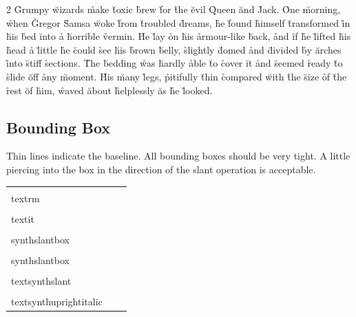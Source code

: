 \documentclass[a4paper]{article}
\def\synthslant{.16}
\def\synthnegslant{-.14}
\newcommand*{\code}[1]{\texttt{#1}}
\newcommand*{\cs}[1]{\texttt{\char`\\#1}}
\newcommand*{\fontsample}{aefgiv}
\newcommand*{\FONTSAMPLE}{H\AA{}MB\"URG\'EF\O{}\~N\v{S}}
\newcommand*{\showbaseline}{\space\rule{.5em}{.4pt}\space}
\newcommand*{\showboundingbox}[1]{
  {\setlength{\fboxsep}{0pt}
   \setlength{\fboxrule}{.4pt}
   \framebox{#1}}
}
\begin{document}
\begin{multicols}{2}
  \r{Grumpy} \u{wizards} \r{make} \u{toxic} \r{brew} \u{for} \r{the} \u{evil} \r{Queen} \u{and} \r{Jack.}
  \r{One} \u{morn\-ing,} \r{when} \u{Gregor} \r{Samsa} \u{woke} \r{from} \u{trou\-bled} \r{dreams,}
  \r{he} \u{found} \r{himself} \u{trans\-formed} \r{in} \u{his} \r{bed} \u{into} \r{a} \u{hor\-ri\-ble} \r{vermin.}
  \r{He} \u{lay} \r{on} \u{his} \r{armour-like} \u{back,}
  \r{and} \u{if} \r{he} \u{lifted} \u{his} \r{head}
  \r{a} \u{little} \r{he} \u{could} \r{see} \u{his} \r{brown} \u{belly,}
  \r{slightly} \u{domed} \r{and} \u{divided} \r{by} \u{arches} \r{into} \u{stiff} \r{sections.}
  \r{The} \u{bedding} \r{was} \u{hardly} \r{able} \u{to}
  \r{cover} \u{it} \r{and} \u{seemed} \r{ready} \u{to} \r{slide} \u{off} \r{any} \u{mo\-ment.}
  \r{His} \u{many} \r{legs,}
  \r{pitifully} \u{thin} \r{compared} \u{with} \r{the} \u{size} \r{of} \u{the} \r{rest} \u{of} \r{him,}
  \r{waved} \u{about} \r{helplessly} \u{as} \r{he} \u{looked.}
\end{multicols}

\clearpage
\subsection{Bounding Box}

Thin lines indicate the baseline.  All bounding boxes should be very tight.  A little piercing
into the box in the direction of the slant operation is acceptable.

\begin{center}
  \begin{tabular}{@{}l@{\showbaseline}l@{\showbaseline}l@{\showbaseline}}
    \cs{textrm}  &
    \showboundingbox{\textrm{\fontsample}}  &
    \showboundingbox{\textrm{\FONTSAMPLE}}  \\
    \cs{textit}  &
    \showboundingbox{\textit{\fontsample}}  &
    \showboundingbox{\textit{\FONTSAMPLE}}  \\
    \cs{synthslantbox}\code{\{\synthslant\}}  &
    \showboundingbox{\synthslantbox{\synthslant}{\fontsample}}  &
    \showboundingbox{\synthslantbox{\synthslant}{\FONTSAMPLE}}  \\
    \cs{synthslantbox}\code{\{\synthnegslant\}}  &
    \showboundingbox{\synthslantbox{\synthnegslant}{\itshape\fontsample}}  &
    \showboundingbox{\synthslantbox{\synthnegslant}{\itshape\FONTSAMPLE}}  \\
    \cs{textsynthslant}  &
    \showboundingbox{\textsynthslant{\fontsample}}  &
    \showboundingbox{\textsynthslant{\FONTSAMPLE}}  \\
    \cs{textsynthuprightitalic}  &
    \showboundingbox{\textsynthuprightitalic{\fontsample}}  &
    \showboundingbox{\textsynthuprightitalic{\FONTSAMPLE}}
  \end{tabular}
\end{center}
\end{document}
